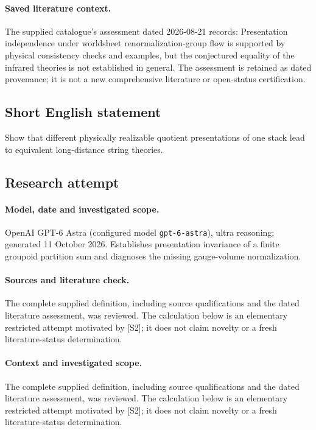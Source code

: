 \documentclass[11pt]{article}
\begin{document}
\paragraph{Saved literature context.} The supplied catalogue's assessment dated 2026-08-21 records: Presentation independence under worldsheet renormalization-group flow is supported by physical consistency checks and examples, but the conjectured equality of the infrared theories is not established in general. The assessment is retained as dated provenance; it is not a new comprehensive literature or open-status certification.
\subsection{Short English statement}
Show that different physically realizable quotient presentations of one stack lead to equivalent long-distance string theories.
\subsection{Research attempt}
\paragraph{Model, date and investigated scope.}
OpenAI GPT-6 Astra (configured model \texttt{gpt-6-astra}), ultra reasoning; generated 11 October 2026. Establishes presentation invariance of a finite groupoid partition sum and diagnoses the missing gauge-volume normalization.

\paragraph{Sources and literature check.}
The complete supplied definition, including source qualifications and the dated literature assessment, was reviewed. The calculation below is an elementary restricted attempt motivated by [S2]; it does not claim novelty or a fresh literature-status determination.

\paragraph{Context and investigated scope.} The complete supplied definition, including source qualifications and the dated literature assessment, was reviewed. The calculation below is an elementary restricted attempt motivated by [S2]; it does not claim novelty or a fresh literature-status determination.
\end{document}
